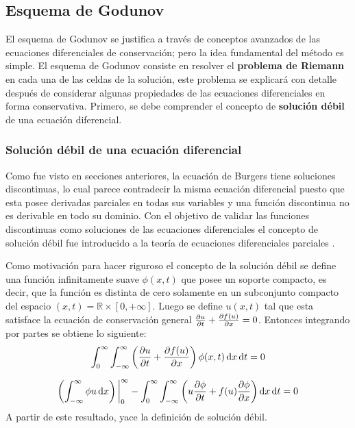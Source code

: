 \documentclass[12pt]{article}
\begin{document}
	\subsection{Esquema de Godunov}
	El esquema de Godunov se justifica a través de conceptos avanzados de las ecuaciones diferenciales de conservación; pero la idea fundamental del método es simple. El esquema de Godunov consiste en resolver el \textbf{problema de Riemann} en cada una de las celdas de la solución, este problema se explicará con detalle después de considerar algunas propiedades de las ecuaciones diferenciales en forma conservativa. Primero, se debe comprender el concepto de \textbf{solución débil} de una ecuación diferencial.
	\subsubsection{Solución débil de una ecuación diferencial}
	Como fue visto en secciones anteriores, la ecuación de Burgers tiene soluciones discontinuas, lo cual parece contradecir la misma ecuación diferencial puesto que esta posee derivadas parciales en todas sus variables y una función discontinua no es derivable en todo su dominio. Con el objetivo de validar las funciones discontinuas como soluciones de las ecuaciones diferenciales el concepto de solución débil fue introducido a la teoría de ecuaciones diferenciales parciales \cite{Cameron}.
	
	Como motivación para hacer riguroso el concepto de la solución débil se define una función infinitamente suave $\phi(x,t)$ que posee un soporte compacto, es decir, que la función es distinta de cero solamente en un subconjunto compacto del espacio $(x,t)= \mathbb{R} \times \left[ 0, + \infty \right] $. Luego se define $u(x,t)$ tal que esta satisface la ecuación de conservación general $\pdv{u}{t} + \pdv{f(u)}{x}=0$. Entonces integrando por partes se obtiene lo siguiente:
	\begin{equation}
		\int_{0}^{\infty}\int_{-\infty}^{\infty}\left( \pdv{u}{t} + \pdv{f(u)}{x} \right)\phi(x,t)\dd{x}\dd{t} = 0
		\label{eq:integral_conservative1}
	\end{equation}
	 
	 \begin{equation}
	 	\left( \int_{-\infty}^{\infty} \phi u \dd{x} \right)\bigg|_{0}^{\infty} - \int_{0}^{\infty}\int_{-\infty}^{\infty}\left( u\pdv{\phi}{t} + f(u)\pdv{\phi}{x}\right)\dd{x}\dd{t}=0
	 	\label{eq:integral_conservative2}
	 \end{equation}
	A partir de este resultado, yace la definición de solución débil.
	
\end{document}
